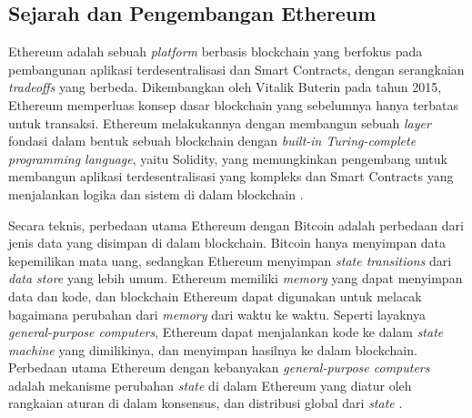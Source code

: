 \subsection{Sejarah dan Pengembangan Ethereum}
\label{subsec:sejarah-pengembangan-ethereum}

Ethereum adalah sebuah \textit{platform} berbasis blockchain yang berfokus pada pembangunan aplikasi terdesentralisasi dan Smart Contracts, dengan serangkaian \textit{tradeoffs} yang berbeda.
Dikembangkan oleh Vitalik Buterin pada tahun 2015, Ethereum memperluas konsep dasar blockchain yang sebelumnya hanya terbatas untuk transaksi. Ethereum melakukannya dengan membangun sebuah \textit{layer} fondasi dalam bentuk sebuah blockchain dengan \textit{built-in Turing-complete programming language}, yaitu Solidity, yang memungkinkan pengembang untuk membangun aplikasi terdesentralisasi yang kompleks dan Smart Contracts yang menjalankan logika dan sistem di dalam blockchain \parencite{buterin2013ethereum}.

Secara teknis, perbedaan utama Ethereum dengan Bitcoin adalah perbedaan dari jenis data yang disimpan di dalam blockchain. Bitcoin hanya menyimpan data kepemilikan mata uang, sedangkan Ethereum menyimpan \textit{state transitions} dari \textit{data store} yang lebih umum. Ethereum memiliki \textit{memory} yang dapat menyimpan data dan kode, dan blockchain Ethereum dapat digunakan untuk melacak bagaimana perubahan dari \textit{memory} dari waktu ke waktu. Seperti layaknya \textit{general-purpose computers}, Ethereum dapat menjalankan kode ke dalam \textit{state machine} yang dimilikinya, dan menyimpan hasilnya ke dalam blockchain. Perbedaan utama Ethereum dengan kebanyakan \textit{general-purpose computers} adalah mekanisme perubahan \textit{state} di dalam Ethereum yang diatur oleh rangkaian aturan di dalam konsensus, dan distribusi global dari \textit{state} \parencite{antonopoulos2018mastering}.




